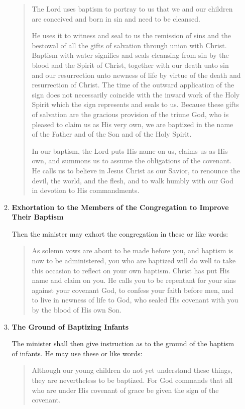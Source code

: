 \documentclass[
]{book}
\begin{document}
\begin{enumerate}
\begin{enumerate}
\begin{quote}
    The Lord uses baptism to portray to us that we and our children are conceived and born in sin and need to be cleansed.

    He uses it to witness and seal to us the remission of sins and the bestowal of all the gifts of salvation through union with Christ. Baptism with water signifies and seals cleansing from sin by the blood and the Spirit of Christ, together with our death unto sin and our resurrection unto newness of life by virtue of the death and resurrection of Christ. The time of the outward application of the sign does not necessarily coincide with the inward work of the Holy Spirit which the sign represents and seals to us. Because these gifts of salvation are the gracious provision of the triune God, who is pleased to claim us as His very own, we are baptized in the name of the Father and of the Son and of the Holy Spirit.

    In our baptism, the Lord puts His name on us, claims us as His own, and summons us to assume the obligations of the covenant. He calls us to believe in Jesus Christ as our Savior, to renounce the devil, the world, and the flesh, and to walk humbly with our God in devotion to His commandments.
    \end{quote}
  \item
    \textbf{Exhortation to the Members of the Congregation to Improve Their Baptism}

    Then the minister may exhort the congregation in these or like words:

    \begin{quote}
    As solemn vows are about to be made before you, and baptism is now to be administered, you who are baptized will do well to take this occasion to reflect on your own baptism. Christ has put His name and claim on you. He calls you to be repentant for your sins against your covenant God, to confess your faith before men, and to live in newness of life to God, who sealed His covenant with you by the blood of His own Son.
    \end{quote}
  \item
    \textbf{The Ground of Baptizing Infants}

    The minister shall then give instruction as to the ground of the baptism of infants. He may use these or like words:

    \begin{quote}
    Although our young children do not yet understand these things, they are nevertheless to be baptized. For God commands that all who are under His covenant of grace be given the sign of the covenant.


\end{quote}
\end{enumerate}
\end{enumerate}
\end{document}
